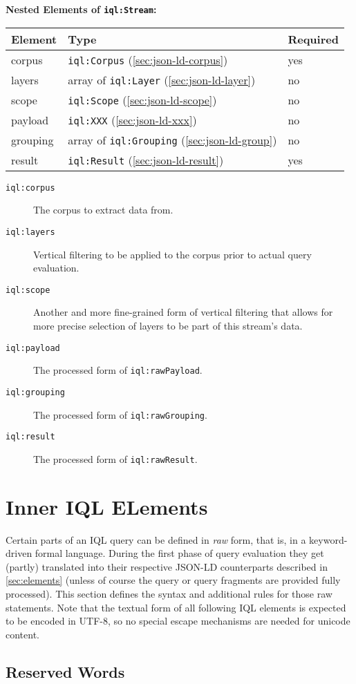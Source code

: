 \documentclass[11pt]{article}
\newcommand{\iql}{IQL\xspace}
\newcommand{\iqlns}{iql:}
\newcommand{\iqlType}[1]{\texttt{\iqlns#1}}
\newenvironment{elements}[1]{
\noindent\textbf{Nested Elements of #1:}\newline\medskip
\begin{tabular}{|p{0.3\textwidth}|p{0.42\textwidth}|p{0.17\textwidth}|}
	\hline
	\textbf{Element} & \textbf{Type} & \textbf{Required} \\ 
	\hline
	\hline
}{
\end{tabular}
}
\newcommand{\element}[3]{
#1 & #2 & #3 \\
\hline
}
\begin{document}
\begin{elements}{\iqlType{Stream}}
	\element{corpus}{\iqlType{Corpus} (\ref{sec:json-ld-corpus})}{yes}
	\element{layers}{array of \iqlType{Layer} (\ref{sec:json-ld-layer})}{no}
	\element{scope}{\iqlType{Scope} (\ref{sec:json-ld-scope})}{no}
	\element{payload}{\iqlType{XXX} (\ref{sec:json-ld-xxx})}{no}
	\element{grouping}{array of \iqlType{Grouping} (\ref{sec:json-ld-group})}{no}
	\element{result}{\iqlType{Result} (\ref{sec:json-ld-result})}{yes}
\end{elements}
\begin{description}
	\item[\iqlType{corpus}] The corpus to extract data from.
	\item[\iqlType{layers}] Vertical filtering to be applied to the corpus prior to actual query evaluation.
	\item[\iqlType{scope}] Another and more fine-grained form of vertical filtering that allows for more precise selection of layers to be part of this stream's data.
	\item[\iqlType{payload}] The processed form of \iqlType{rawPayload}.
	\item[\iqlType{grouping}] The processed form of \iqlType{rawGrouping}.
	\item[\iqlType{result}] The processed form of \iqlType{rawResult}.
\end{description}


\section{Inner \iql ELements}
\label{sec:inner-iql-elements}

Certain parts of an \iql query can be defined in \textit{raw} form, that is, in a keyword-driven formal language.
During the first phase of query evaluation they get (partly) translated into their respective JSON-LD counterparts described in \cref{sec:elements} (unless of course the query or query fragments are provided fully processed).
This section defines the syntax and additional rules for those raw statements.
Note that the textual form of all following \iql elements is expected to be encoded in UTF-8, so no special escape mechanisms are needed for unicode content.




\subsection{Reserved Words}
\label{sec:reserved-words}
\end{document}
